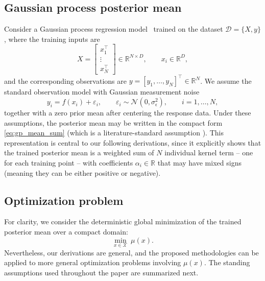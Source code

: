\documentclass[pdflatex,sn-mathphys-num]{sn-jnl}%
\theoremstyle{thmstyleone}%
\theoremstyle{thmstyletwo}%
\theoremstyle{thmstylethree}%
\begin{document}
\subsection{Gaussian process posterior mean}

Consider a Gaussian process regression model~\cite{ref:gp_book} trained on the dataset $\mathcal{D}=\{X,y\}$, where the training inputs are
\[
X=
\begin{bmatrix}
x_1^\top\\
\vdots\\
x_N^\top
\end{bmatrix}
\in\mathbb{R}^{N\times D},
\qquad
x_i\in\mathbb{R}^D,
\]
and the corresponding observations are $y=[y_1,\ldots,y_N]^\top\in\mathbb{R}^N$. We assume the standard observation model with Gaussian measurement noise
\[
y_i=f(x_i)+\varepsilon_i,
\qquad
\varepsilon_i\sim\mathcal{N}(0,\sigma_\epsilon^2),
\qquad i=1,\ldots,N,
\]
together with a zero prior mean after centering the response data. Under these assumptions, the posterior mean may be written in the compact form \eqref{eq:gp_mean_sum} (which is a literature-standard assumption \cite{bradford2018efficient, paulson2022cobalt}). This representation is central to our following derivations, since it explicitly shows that the trained posterior mean is a weighted sum of $N$ individual kernel term -- one for each training point -- with coefficients $\alpha_i\in\mathbb{R}$ that may have mixed signs (meaning they can be either positive or negative).

\subsection{Optimization problem}

For clarity, we consider the deterministic global minimization of the trained posterior mean over a compact domain:
\begin{equation}
\min_{x\in\mathcal{X}} \ \mu(x).
\label{eq:mean_problem}
\end{equation}
Nevertheless, our derivations are general, and the proposed methodologies can be applied to more general optimization problems involving $\mu(x)$. 
The standing assumptions used throughout the paper are summarized next.
\end{document}
